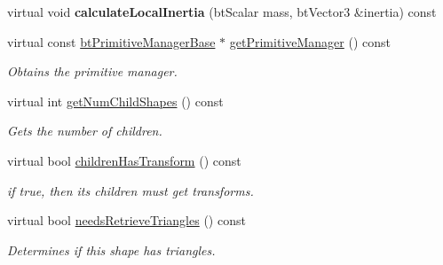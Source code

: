 \begin{DoxyCompactItemize}
\mbox{\label{classbtGImpactMeshShape_a3096adaec09c6623849a3b0e2e382613}} 
virtual void {\bfseries calculate\+Local\+Inertia} (bt\+Scalar mass, bt\+Vector3 \&inertia) const
\item 
\mbox{\label{classbtGImpactMeshShape_a354238c358d9c87d969888a90059e496}} 
virtual const \hyperlink{classbtPrimitiveManagerBase}{bt\+Primitive\+Manager\+Base} $\ast$ \hyperlink{classbtGImpactMeshShape_a354238c358d9c87d969888a90059e496}{get\+Primitive\+Manager} () const
\begin{DoxyCompactList}\small\item\em Obtains the primitive manager. \end{DoxyCompactList}\item 
\mbox{\label{classbtGImpactMeshShape_a1f5e974d1fa7af3ac25c6d98e106bf55}} 
virtual int \hyperlink{classbtGImpactMeshShape_a1f5e974d1fa7af3ac25c6d98e106bf55}{get\+Num\+Child\+Shapes} () const
\begin{DoxyCompactList}\small\item\em Gets the number of children. \end{DoxyCompactList}\item 
\mbox{\label{classbtGImpactMeshShape_a0982a5913488f1446c06446c1d8ec645}} 
virtual bool \hyperlink{classbtGImpactMeshShape_a0982a5913488f1446c06446c1d8ec645}{children\+Has\+Transform} () const
\begin{DoxyCompactList}\small\item\em if true, then its children must get transforms. \end{DoxyCompactList}\item 
\mbox{\label{classbtGImpactMeshShape_afa72eb4e1537ca2853ae731eb87f32d0}} 
virtual bool \hyperlink{classbtGImpactMeshShape_afa72eb4e1537ca2853ae731eb87f32d0}{needs\+Retrieve\+Triangles} () const
\begin{DoxyCompactList}\small\item\em Determines if this shape has triangles. \end{DoxyCompactList}\item 
\mbox{\label{classbtGImpactMeshShape_abe38ef4a56534abcd43dbe2e45e46157}} 

\end{DoxyCompactItemize}
